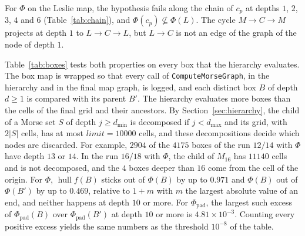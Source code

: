 \documentclass[11pt]{article}
\theoremstyle{plain}
\theoremstyle{definition}
\theoremstyle{remark}
\DeclareMathOperator{\hull}{hull}
\newcommand{\dmin}{d_{\min}}
\newcommand{\dmax}{d_{\max}}
\newcommand{\Phipad}{\Phi_{\mathrm{pad}}}
\newcommand{\code}[1]{\texttt{#1}}
\begin{document}
For $\Phi$ on the Leslie map, the hypothesis fails along the chain of $c_p$ at depths $1$, $2$, $3$, $4$ and $6$ (Table~\ref{tab:chain}), and $\Phi(c_p)\not\subseteq\Phi(L)$. The cycle $M\to C\to M$ projects at depth $1$ to $L\to C\to L$, but $L\to C$ is not an edge of the graph of the node of depth $1$.

Table~\ref{tab:boxes} tests both properties on every box that the hierarchy evaluates. The box map is wrapped so that every call of \code{ComputeMorseGraph}, in the hierarchy and in the final map graph, is logged, and each distinct box $B$ of depth $d\geq1$ is compared with its parent $B'$. The hierarchy evaluates more boxes than the cells of the final grid and their ancestors. By Section~\ref{sec:hierarchy}, the child of a Morse set $S$ of depth $j\geq\dmin$ is decomposed if $j<\dmax$ and its grid, with $2|S|$ cells, has at most $\mathit{limit}=10000$ cells, and these decompositions decide which nodes are discarded. For example, $2904$ of the $4175$ boxes of the run $12/14$ with $\Phi$ have depth $13$ or $14$. In the run $16/18$ with $\Phi$, the child of $M_{16}$ has $11140$ cells and is not decomposed, and the $4$ boxes deeper than $16$ come from the cell of the origin. For $\Phi$, $\hull f(B)$ sticks out of $\Phi(B)$ by up to $0.971$ and $\Phi(B)$ out of $\Phi(B')$ by up to $0.469$, relative to $1+m$ with $m$ the largest absolute value of an end, and neither happens at depth $10$ or more. For $\Phipad$, the largest such excess of $\Phipad(B)$ over $\Phipad(B')$ at depth $10$ or more is $4.81\times10^{-3}$. Counting every positive excess yields the same numbers as the threshold $10^{-8}$ of the table.
\end{document}
